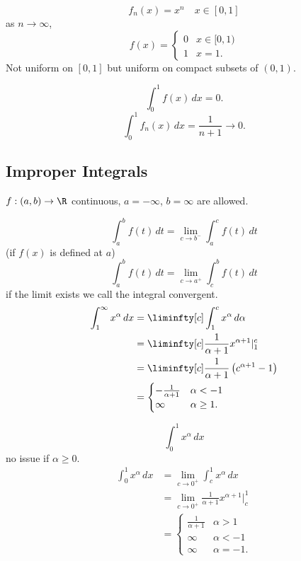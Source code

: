 \documentclass[10pt, a4paper]{article}
\begin{document}
\begin{example}
    \[
    f_n(x) = x ^ n\quad x \in [0, 1]
    \]
    as $n \to \infty$,
    \[
    f(x) = \begin{cases}
        0 & x \in [0, 1) \\
        1 & x = 1.
    \end{cases}
    \]
    Not uniform on $[0, 1]$ but uniform on compact subsets of $(0, 1)$.

    \[
    \int_{0}^{1}f(x)\,dx = 0.
    \]
    \[
    \int_{0}^{1}f_n(x)\,dx = \frac{1}{n + 1} \to 0.
    \]
\end{example}

\subsection{Improper Integrals}

$f : (a, b) \to \R$ continuous,
$a = -\infty$,
$b = \infty$ are allowed.

\[
\int_{a}^{b}f(t)\,dt = \lim_{c \to b ^ {-}}\int_{a}^{c}f(t)\,dt
\]
(if $f(x)$ is defined at $a$)
\[
\int_{a}^{b}f(t)\,dt = \lim_{c \to a ^ {+}}\int_{c}^{b}f(t)\,dt
\]
if the limit exists we call the integral convergent.
\begin{align*}
    \int_{1}^{\infty}x ^ {\alpha}\,dx &= \liminfty[c]\int_{1}^{c}x ^ {\alpha}\,d\alpha \\
    &= \liminfty[c]\frac{1}{\alpha + 1}x ^ {\alpha + 1}|_{1}^{c} \\
    &= \liminfty[c]\frac{1}{\alpha + 1}\left(c ^ {\alpha + 1} - 1\right) \\
    &= \begin{cases}
        -\frac{1}{\alpha + 1} & \alpha < -1 \\
        \infty & \alpha \geq 1.
    \end{cases}
\end{align*}

\[
\int_{0}^{1}x ^ {\alpha}\,dx
\]
no issue if $\alpha \geq 0$.
\begin{align*}
    \int_{0}^{1}x ^ {\alpha}\,dx &= \lim_{c \to 0 ^ {+}}\int_{c}^{1}x ^ {\alpha}\,dx \\
    &= \lim_{c \to 0 ^ {+}}\frac{1}{\alpha + 1}x ^ {\alpha + 1}|_{c}^{1} \\
    &= \begin{cases}
        \frac{1}{\alpha + 1} & \alpha > 1 \\
        \infty & \alpha < -1 \\
        \infty & \alpha = -1.
    \end{cases}
\end{align*}
\end{document}
